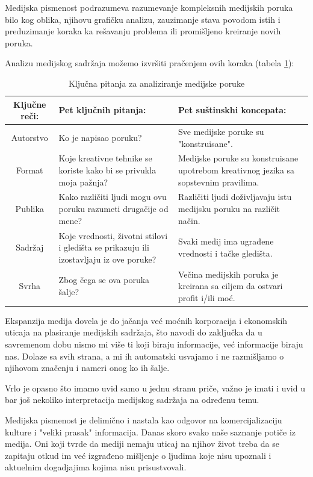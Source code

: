 \documentclass[a4paper]{article}
\begin{document}
\begin{itemize}
Medijska pismenost podrazumeva razumevanje kompleksnih medijskih poruka bilo kog oblika, njihovu grafičku analizu, zauzimanje stava povodom istih i preduzimanje koraka ka rešavanju problema ili promišljeno kreiranje novih poruka.

Analizu medijskog sadržaja možemo izvršiti pračenjem ovih koraka (tabela \ref{tab:tabela2}):

\begin{table}[h!]
\begin{center}
\begin{tabular}{|c|p{7cm}|p{5cm} |} \hline
Ključne reči:& Pet ključnih pitanja:& Pet suštinskhi koncepata:\\ \hline
Autorstvo&Ko je napisao poruku?&Sve medijske poruke su "konstruisane".\\ \hline
Format &Koje kreativne tehnike se koriste kako bi se privukla moja pažnja?&Medijske poruke su konstruisane upotrebom kreativnog jezika sa sopstevnim pravilima.\\ \hline
Publika &Kako različiti ljudi mogu ovu poruku razumeti drugačije od mene?&Različiti ljudi doživljavaju istu medijsku poruku na različit način.\\ \hline
Sadržaj &Koje vrednosti, životni stilovi i gledišta se prikazuju ili izostavljaju iz ove poruke?&Svaki medij ima ugrađene vrednosti i tačke gledišta.\\ \hline
Svrha &Zbog čega se ova poruka šalje?&Večina medijskih poruka je kreirana sa ciljem da ostvari profit i/ili moć.\\ \hline
\end{tabular}
\caption{ Ključna pitanja za analiziranje medijske poruke}
\label{tab:tabela2}
\end{center}
\end{table}

Ekspanzija medija dovela je do jačanja već moćnih korporacija i ekonomskih uticaja na plasiranje medijskih sadržaja, što navodi do zaključka da u savremenom dobu nismo mi više ti koji biraju informacije, već informacije biraju nas. Dolaze sa svih strana, a mi ih automatski usvajamo i ne razmišljamo o njihovom značenju i nameri onog ko ih šalje.

Vrlo je opasno što imamo uvid samo u jednu stranu priče, važno je imati i uvid u bar još nekoliko interpretacija medijskog sadržaja na određenu temu.

Medijska pismenost je delimično i nastala kao odgovor na komercijalizaciju kulture i "veliki prasak" informacija. Danas skoro svako naše saznanje potiče iz medija. Oni koji tvrde da mediji nemaju uticaj na njihov život treba da se zapitaju otkud im već izgrađeno mišljenje o ljudima koje nisu upoznali i aktuelnim dogadjajima kojima nisu prisustvovali.


\end{itemize}
\end{document}
